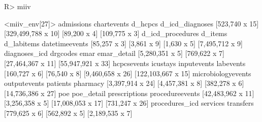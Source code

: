 \documentclass[
  notitle]{jss}
\begin{document}
\begin{CodeChunk}
\begin{CodeInput}
R> miiv
\end{CodeInput}
\begin{CodeOutput}
<miiv_env[27]>
        admissions        chartevents            d_hcpcs    d_icd_diagnoses 
    [523,740 x 15] [329,499,788 x 10]       [89,200 x 4]      [109,775 x 3] 
  d_icd_procedures            d_items         d_labitems     datetimeevents 
      [85,257 x 3]        [3,861 x 9]        [1,630 x 5]    [7,495,712 x 9] 
     diagnoses_icd           drgcodes               emar        emar_detail 
   [5,280,351 x 5]      [769,622 x 7]  [27,464,367 x 11]  [55,947,921 x 33] 
       hcpcsevents           icustays        inputevents          labevents 
     [160,727 x 6]       [76,540 x 8]   [9,460,658 x 26] [122,103,667 x 15] 
microbiologyevents       outputevents           patients           pharmacy 
  [3,397,914 x 24]    [4,457,381 x 8]      [382,278 x 6]  [14,736,386 x 27] 
               poe         poe_detail      prescriptions    procedureevents 
 [42,483,962 x 11]    [3,256,358 x 5]  [17,008,053 x 17]     [731,247 x 26] 
    procedures_icd           services          transfers 
     [779,625 x 6]      [562,892 x 5]    [2,189,535 x 7] 
\end{CodeOutput}
\end{CodeChunk}
\end{document}
